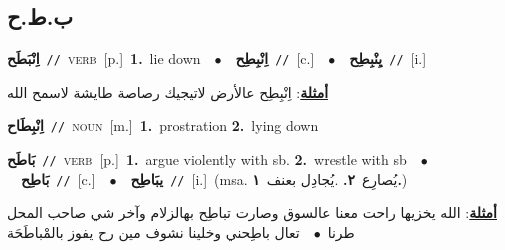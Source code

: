 \documentclass[10pt,a4paper,twoside]{article} %
\begin{document}
\begin{multicols}{2}
\vspace{-3mm}
\subsection*{\color{blue}\foreignlanguage{arabic}{ب.ط.ح}\color{blue}{}} 

{\setlength\topsep{0pt}\textbf{\foreignlanguage{arabic}{اِنْبَطَح}}\ {\color{gray}\texttt{//}\color{black}}\ \textsc{verb}\ [p.]\ \textbf{1.}~lie down\ \ $\bullet$\ \ \setlength\topsep{0pt}\textbf{\foreignlanguage{arabic}{اِنْبِطِح}}\ {\color{gray}\texttt{//}\color{black}}\ [c.]\ \ $\bullet$\ \ \setlength\topsep{0pt}\textbf{\foreignlanguage{arabic}{يِنْبِطِح}}\ {\color{gray}\texttt{//}\color{black}}\ [i.]\  \begin{flushright}\color{gray}\foreignlanguage{arabic}{\textbf{\underline{\foreignlanguage{arabic}{أمثلة}}}: اِنْبِطِح عالأرض لاتيجيك رصاصة طايشة لاسمح الله}\end{flushright}\color{black}} \vspace{2mm}

{\setlength\topsep{0pt}\textbf{\foreignlanguage{arabic}{اِنْبِطَاح}}\ {\color{gray}\texttt{//}\color{black}}\ \textsc{noun}\ [m.]\ \textbf{1.}~prostration  \textbf{2.}~lying down\ } \vspace{2mm}

{\setlength\topsep{0pt}\textbf{\foreignlanguage{arabic}{بَاطَح}}\ {\color{gray}\texttt{//}\color{black}}\ \textsc{verb}\ [p.]\ \textbf{1.}~argue violently with sb.  \textbf{2.}~wrestle with sb\ \ $\bullet$\ \ \setlength\topsep{0pt}\textbf{\foreignlanguage{arabic}{بَاطِح}}\ {\color{gray}\texttt{//}\color{black}}\ [c.]\ \ $\bullet$\ \ \setlength\topsep{0pt}\textbf{\foreignlanguage{arabic}{يبَاطِح}}\ {\color{gray}\texttt{//}\color{black}}\ [i.]\ \color{gray}(msa. \foreignlanguage{arabic}{يُصارِع}~\foreignlanguage{arabic}{\textbf{٢.}}  .\foreignlanguage{arabic}{يُجادِل بعنف}~\foreignlanguage{arabic}{\textbf{١.}})\color{black}\  \begin{flushright}\color{gray}\foreignlanguage{arabic}{\textbf{\underline{\foreignlanguage{arabic}{أمثلة}}}: الله يخزيها راحت معنا عالسوق وصارت تباطِح بهالزلام وآخر شي صاحب المحل طرنا\ $\bullet$\ \  تعال باطِحني وخلينا نشوف مين رح يفوز بالمْباطَحَة}\end{flushright}\color{black}} \vspace{2mm}


\end{multicols}
\end{document}
